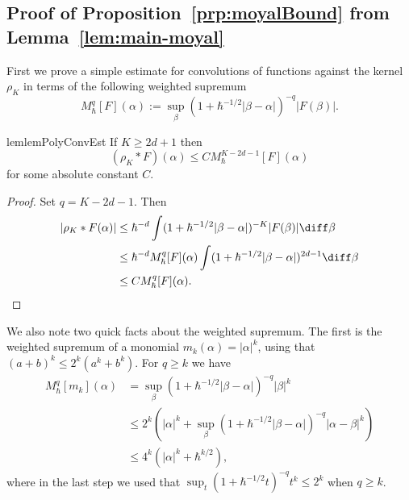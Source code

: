 \documentclass{article}
\numberwithin{equation}{section}
\begin{document}
\subsection{Proof of Proposition~\ref{prp:moyalBound} from Lemma~\ref{lem:main-moyal}}
\label{sec:applications}
First we prove a simple estimate for convolutions of functions against the kernel $\rho_K$
in terms of the following weighted supremum
\begin{equation}
	M_\hbar^q[F](\alpha) := \sup_{\beta} (1 + \hbar^{-1/2}|\beta-\alpha|)^{-q} |F(\beta)|.
\end{equation}
\begin{restatable}{lem}{lemPolyConvEst}
	\label{lem:poly-conv-est}
	If $K \geq 2d+1$ then
	\begin{equation}
		\label{eq:rho-convolve-bd}
		(\rho_K \ast F)
		(\alpha) \leq C M_\hbar^{K-2d-1}[F](\alpha)
	\end{equation}
	for some absolute constant $C$.
\end{restatable}
\begin{proof}
	Set $q=K-2d-1$.  Then
	\begin{equation}
		\begin{split}
			|\rho_K\ast F (\alpha)|
			&\leq \hbar^{-d} \int (1 + \hbar^{-1/2}|\beta-\alpha|)^{-K} |F(\beta)|\diff\beta \\
			&\leq \hbar^{-d} M_\hbar^q[F](\alpha) \int (1+\hbar^{-1/2}|\beta-\alpha|)^{2d-1} \diff\beta \\
			&\leq CM_\hbar^q[F](\alpha).
		\end{split}
	\end{equation}
\end{proof}

We also note two quick facts about the weighted supremum.  The first is the weighted supremum of a monomial
$m_k(\alpha) = |\alpha|^k$, using that $(a+b)^k \leq 2^k (a^k + b^k)$.  For $q\geq k$ we have
\begin{equation}
	\label{eq:maximal-monomial}
	\begin{split}
		M_\hbar^q[m_k](\alpha)
		&= \sup_\beta (1+\hbar^{-1/2}|\beta-\alpha|)^{-q} |\beta|^k \\
		&\leq 2^k (|\alpha|^k +
		\sup_\beta (1+\hbar^{-1/2}|\beta-\alpha|)^{-q} |\alpha-\beta|^k) \\
		&\leq 4^k (|\alpha|^k + \hbar^{k/2}),
	\end{split}
\end{equation}
where in the last step we used that 
$\sup_t (1+\hbar^{-1/2}t)^{-q}t^k \leq 2^k$
when $q\geq k$.
\end{document}
